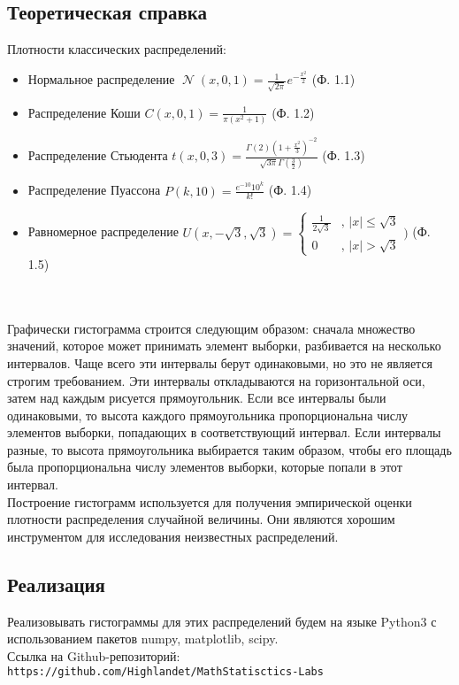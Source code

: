 \documentclass[14pt]{extarticle}
\DeclareMathOperator{\normal}{\mathcal{N}} %
\begin{document}
\subsection{Теоретическая справка}

Плотности классических распределений:
\begin{itemize}
    \item Нормальное распределение \(\normal(x, 0,1)=\frac{1}{\sqrt{2\pi}}e^{-\frac{x^2}{2}}\) (Ф. 1.1)
    \item Распределение Коши \(C(x,0,1)=\frac{1}{\pi (x^2+1)}\) (Ф. 1.2)
    \item Распределение Стьюдента \(t(x,0,3)=\frac{\Gamma(2)(1+\frac{x^2}{3})^{-2}}{\sqrt{3\pi}\Gamma(\frac{3}{2})}\) 
    (Ф. 1.3)
    \item Распределение Пуассона \(P(k, 10)=\frac{e^{-10}10^k}{k!}\) (Ф. 1.4)
    \item Равномерное распределение \(U(x, -\sqrt{3}, \sqrt{3})=\begin{cases} 
    \frac{1}{2\sqrt{3}}&\text{, } |x|\leq\sqrt{3} \\
    0&\text{, } |x|>\sqrt{3} 
\end{cases})\) (Ф. 1.5)
\end{itemize}\\\\
Графически гистограмма строится следующим образом: сначала множество значений, которое может принимать элемент выборки, разбивается на несколько интервалов. Чаще всего эти интервалы берут одинаковыми, но это не является строгим требованием. Эти интервалы откладываются на горизонтальной оси, затем над каждым рисуется прямоугольник. Если все интервалы были одинаковыми, то высота каждого прямоугольника пропорциональна числу элементов выборки, попадающих в соответствующий интервал. Если интервалы разные, то высота прямоугольника выбирается таким образом, чтобы его площадь была пропорциональна числу элементов выборки, которые попали в этот интервал.\\
Построение гистограмм используется для получения эмпирической оценки плотности распределения случайной величины. Они являются хорошим инструментом для исследования неизвестных распределений.

\subsection{Реализация}

Реализовывать гистограммы для этих распределений будем на языке Python3 с использованием пакетов numpy, matplotlib, scipy. \\
Ссылка на Github-репозиторий: \texttt{https://github.com/Highlandet/MathStatisctics-Labs}
\end{document}
